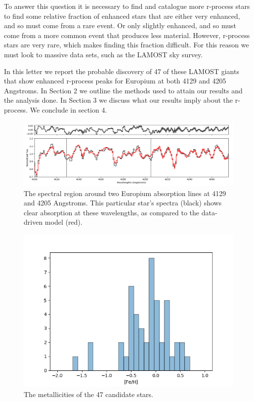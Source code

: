 \documentclass[a4paper,fleqn,usenatbib]{mnras}
\begin{document}
	To answer this question it is necessary to find and catalogue more r-process stars to find some relative fraction of enhanced stars that are either very enhanced, and so must come from a rare event. Or only slightly enhanced, and so must come from a more common event that produces less material. However, r-process stars are very rare, which makes finding this fraction difficult. For this reason we must look to massive data sets, such as the LAMOST sky survey.
	
	In this letter we report the probable discovery of 47 of these LAMOST giants that show enhanced r-process peaks for Europium at both 4129 and 4205 Angstroms.
	In Section 2 we outline the methods used to attain our results and the analysis done. In Section 3 we discuss what our results imply about the r-process. We conclude in section 4.

	
	\begin{figure}
		\includegraphics[width=\columnwidth]{423451}
		\caption{The spectral region around two Europium absorption lines at 4129 and 4205 Angstroms. This particular star's spectra (black) shows clear absorption at these wavelengths, as compared to the data-driven model (red).}
		\label{fig:starindex_423451}
	\end{figure}
	
	\begin{figure}
		\includegraphics[width=\columnwidth]{metalhistpython}
		\caption{The metallicities of the 47 candidate stars.}
		\label{fig:starindex_423451}
	\end{figure}
	
\end{document}

